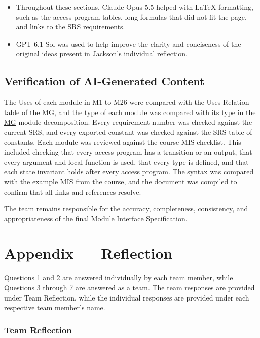 \documentclass[10pt, titlepage]{article}
\newcommand{\mgurl}{https://github.com/team-hindsight/ophthamology-game/blob/main/pdfs/Design/SoftArchitecture/MG.pdf}
\newcommand{\mg}{\href{\mgurl}{MG}}
\begin{document}
\begin{itemize}
    \item Throughout these sections, Claude Opus 5.5 helped with \LaTeX{}
    formatting, such as the access program tables, long formulas that did not
    fit the page, and links to the SRS requirements.

    \item GPT-6.1 Sol was used to help improve the clarity and conciseness of the original ideas present in Jackson's individual reflection.
\end{itemize}

\subsection{Verification of AI-Generated Content}

The Uses of each module in M1 to M26 were compared with the Uses Relation
table of the \mg{}, and the type of each module was compared with its type in the
\mg{} module decomposition. Every requirement number was checked against the
current SRS, and every exported constant was checked against the SRS table of
constants. Each module
was reviewed against the course MIS checklist. This included checking that
every access program has a transition or an output, that every argument and
local function is used, that every type is defined, and that each state
invariant holds after every access program. The syntax was compared with the
example MIS from the course, and the document was compiled to confirm that all
links and references resolve.

The team remains responsible for the accuracy, completeness, consistency, and
appropriateness of the final Module Interface Specification.

\newpage{}

\section{Appendix --- Reflection}\label{sec:Reflection}

Questions 1 and 2 are answered individually by each team member, while
Questions 3 through 7 are answered as a team. The team responses are
provided under Team Reflection, while the individual responses are provided
under each respective team member's name.

\subsubsection*{Team Reflection}
\end{document}
